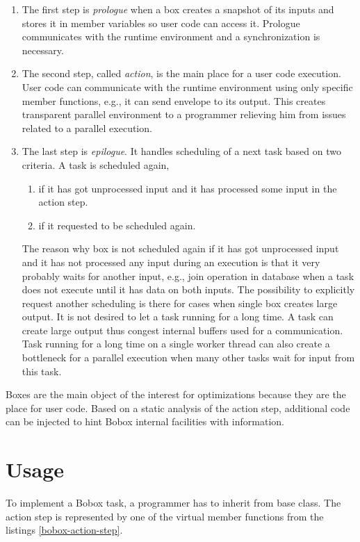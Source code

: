 \begin{enumerate}
\item The first step is \emph{prologue} when a box creates a snapshot of its inputs and stores it in member variables so user code can access it. Prologue communicates with the runtime environment and a synchronization is necessary.
\item The second step, called \emph{action}, is the main place for a user code execution. User code can communicate with the runtime environment using only specific member functions, e.g., it can send envelope to its output. This creates transparent parallel environment to a programmer relieving him from issues related to a parallel execution.
\item The last step is \emph{epilogue}. It handles scheduling of a next task based on two criteria. A task is scheduled again,

\begin{enumerate}
\item if it has got unprocessed input and it has processed some input in the action step.
\item if it requested to be scheduled again.
\end{enumerate}

The reason why box is not scheduled again if it has got unprocessed input and it has not processed any input during an execution is that it very probably waits for another input, e.g., join operation in database when a task does not execute until it has data on both inputs. The possibility to explicitly request another scheduling is there for cases when single box creates large output. It is not desired to let a task running for a long time. A task can create large output thus congest internal buffers used for a communication. Task running for a long time on a single worker thread can also create a bottleneck for a parallel execution when many other tasks wait for input from this task.

\end{enumerate}

Boxes are the main object of the interest for optimizations because they are the place for user code. Based on a static analysis of the action step, additional code can be injected to hint Bobox internal facilities with information.

\section{Usage}
\label{bobox-usage}
To implement a Bobox task, a programmer has to inherit from  base class. The action step is represented by one of the virtual member functions from the listings \ref{bobox-action-step}.

